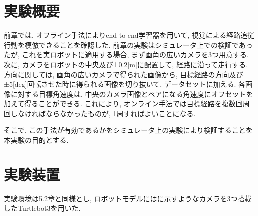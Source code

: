 
\section{実験概要}
前章では, オフライン手法によりend-to-end学習器を用いて, 視覚による経路追従行動を模倣できることを確認した. 前章の実験はシミュレータ上での検証であったが, これを実ロボットに適用する場合, まず画角の広いカメラを3つ用意する. 次に, カメラをロボットの中央及び±0.2[m]に配置して, 経路に沿って走行する. 方向に関しては, 画角の広いカメラで得られた画像から, 目標経路の方向及び±5[deg]回転させた時に得られる画像を切り抜いて, データセットに加える. 各画像に対する目標角速度は, 中央のカメラ画像とペアになる角速度にオフセットを加えて得ることができる. これにより, オンライン手法では目標経路を複数回周回しなければならなかったものが, 1周すればよいことになる. 
\par そこで, この手法が有効であるかをシミュレータ上の実験により検証することを本実験の目的とする. 



\section{実験装置}
実験環境は5.2章と同様とし, ロボットモデルにはに示すようなカメラを3つ搭載したTurtlebot3\cite{turtlebot3}を用いた.

